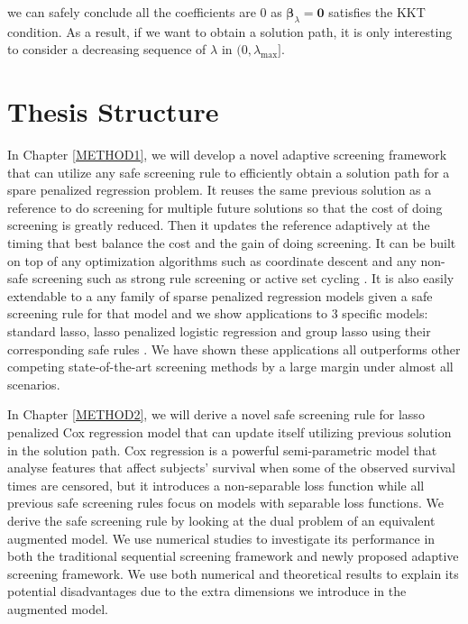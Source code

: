 we can safely conclude all the coefficients are 0 as $\boldsymbol\beta_{\lambda}=\boldsymbol0$ satisfies the KKT condition. As a result, if we want to obtain a solution path, it is only interesting to consider a decreasing sequence of $\lambda$ in $(0,\lambda_{\max}]$.

\section{Thesis Structure}

In Chapter \ref{METHOD1}, we will develop a novel adaptive screening framework that can utilize any safe screening rule to efficiently obtain a solution path for a spare penalized regression problem. It reuses the same previous solution as a reference to do screening for multiple future solutions so that the cost of doing screening is greatly reduced. Then it updates the reference adaptively at the timing that best balance the cost and the gain of doing screening. It can be built on top of any optimization algorithms such as coordinate descent \citep{friedman2007pathwise} and any non-safe screening such as strong rule screening \citep{Tibshirani2012} or active set cycling \citep{lee2007efficient}. It is also easily extendable to a any family of sparse penalized regression models given a safe screening rule for that model and we show applications to 3 specific models: standard lasso, lasso penalized logistic regression and group lasso using their corresponding safe rules \citep{wang2013lasso,wang2014safe}. We have shown these applications all outperforms other competing state-of-the-art screening methods by a large margin under almost all scenarios.

In Chapter \ref{METHOD2}, we will derive a novel safe screening rule for lasso penalized Cox regression model \citep{cox1972regression} that can update itself utilizing previous solution in the solution path. Cox regression is a powerful semi-parametric model that analyse features that affect subjects' survival when some of the observed survival times are censored, but it introduces a non-separable loss function while all previous safe screening rules focus on models with separable loss functions. We derive the safe screening rule by looking at the dual problem of an equivalent augmented model. We use numerical studies to investigate its performance in both the traditional sequential screening framework and newly proposed adaptive screening framework. We use both numerical and theoretical results to explain its potential disadvantages due to the extra dimensions we introduce in the augmented model.

